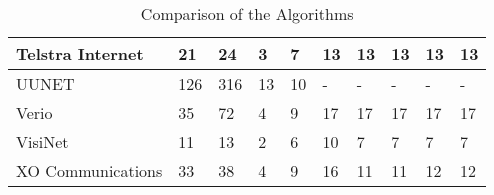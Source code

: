 \documentclass [12pt]{article}
\begin{document}
\begin{table}[H]
{\begin{tabular}{ | l | l | l | l | l | l | l | l | l | l | }
      Telstra Internet            & 21  & 24  & 3   & 7   &   13 &  13      &    13   &   13    &  13 \\ \hline
      UUNET                       & 126 & 316 & 13  & 10  &  -   &  -       &     -   &    -    &  - \\ \hline
      Verio                       & 35  & 72  & 4   & 9   &  17  &   17     &    17   &    17   &  17 \\ \hline
      VisiNet                     & 11  & 13  & 2   & 6   &  10  &   7      &    7    &    7    &  7  \\ \hline
      XO Communications           & 33  & 38  & 4   & 9   &  16  &   11     &    11   &    12   &  12 \\ \hline
    \end{tabular}
    }
    \caption{Comparison of the Algorithms}
    \label{table:compalgs}
  \end{table}
  \thispagestyle{empty}
\end{document}
